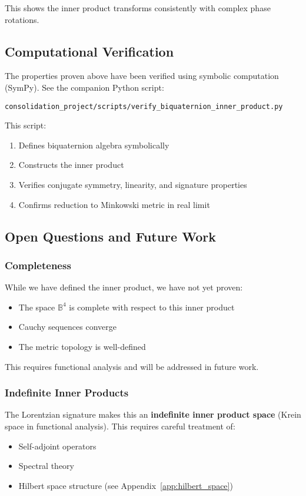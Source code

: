 This shows the inner product transforms consistently with complex phase rotations.

\subsection{Computational Verification}

The properties proven above have been verified using symbolic computation (SymPy). See the companion Python script:
\begin{verbatim}
consolidation_project/scripts/verify_biquaternion_inner_product.py
\end{verbatim}

This script:
\begin{enumerate}
\item Defines biquaternion algebra symbolically
\item Constructs the inner product
\item Verifies conjugate symmetry, linearity, and signature properties
\item Confirms reduction to Minkowski metric in real limit
\end{enumerate}

\subsection{Open Questions and Future Work}

\subsubsection{Completeness}

While we have defined the inner product, we have not yet proven:
\begin{itemize}
\item The space $\mathbb{B}^4$ is complete with respect to this inner product
\item Cauchy sequences converge
\item The metric topology is well-defined
\end{itemize}

This requires functional analysis and will be addressed in future work.

\subsubsection{Indefinite Inner Products}

The Lorentzian signature makes this an \textbf{indefinite inner product space} (Krein space in functional analysis). This requires careful treatment of:
\begin{itemize}
\item Self-adjoint operators
\item Spectral theory
\item Hilbert space structure (see Appendix~\ref{app:hilbert_space})
\end{itemize}

